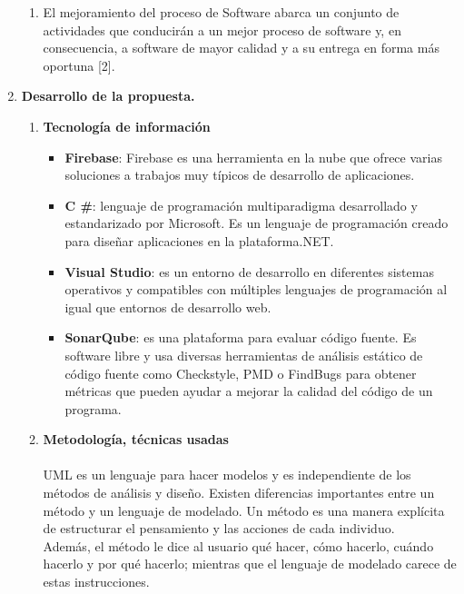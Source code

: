 \documentclass[12pt,a4paper,oneside]{book}
\begin{document}
\begin{enumerate}
\begin{enumerate}
			  	\item El mejoramiento del proceso de Software abarca un conjunto de actividades que conducirán a un mejor proceso de software y, en consecuencia, a software de mayor calidad y a su entrega en forma más oportuna [2]. 
			  	
			  \end{enumerate}
		\item \textbf{Desarrollo de la propuesta.}
			\begin{enumerate}
				\item \textbf{Tecnolog\'ia de informaci\'on }
					\begin{itemize}
						 
						\item \textbf{Firebase}: Firebase es una herramienta en la nube que ofrece varias soluciones a trabajos muy típicos de desarrollo de aplicaciones.
						
						\item \textbf{C \#}: lenguaje de programación multiparadigma desarrollado y estandarizado por Microsoft. Es un lenguaje de programación creado para diseñar aplicaciones en la plataforma.NET.
						
						\item \textbf{Visual Studio}: es un entorno de desarrollo en diferentes sistemas operativos y compatibles con múltiples lenguajes de programación al igual que entornos de desarrollo web.
						
						\item \textbf{SonarQube}: es una plataforma para evaluar código fuente. Es software libre y usa diversas herramientas de análisis estático de código fuente como Checkstyle, PMD o FindBugs para obtener métricas que pueden ayudar a mejorar la calidad del código de un programa. 
						
					\end{itemize}
					
				
				\item \textbf{Metodolog\'ia, t\'ecnicas usadas}\\  \\
						UML es un lenguaje para hacer modelos y es independiente de los métodos de análisis y diseño. Existen diferencias importantes entre un método y un lenguaje de modelado. Un método es una manera explícita de estructurar el pensamiento y las acciones de cada individuo. \\
						
						Además, el método le dice al usuario qué hacer, cómo hacerlo, cuándo hacerlo y por qué hacerlo; mientras que el lenguaje de modelado carece de estas instrucciones. \\ 
						

\end{enumerate}
\end{enumerate}
\end{document}
